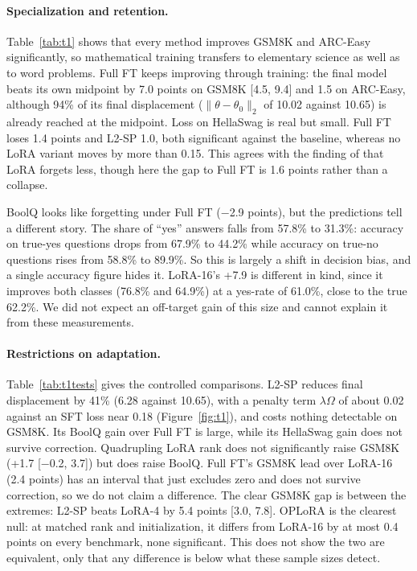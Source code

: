 \documentclass{article}
\begin{document}
\paragraph{Specialization and retention.} Table~\ref{tab:t1} shows that every method improves GSM8K and ARC-Easy significantly, so mathematical training transfers to elementary science as well as to word problems. Full FT keeps improving through training: the final model beats its own midpoint by 7.0 points on GSM8K [4.5, 9.4] and 1.5 on ARC-Easy, although 94\% of its final displacement ($\|\theta-\theta_0\|_2$ of 10.02 against 10.65) is already reached at the midpoint. Loss on HellaSwag is real but small. Full FT loses 1.4 points and L2-SP 1.0, both significant against the baseline, whereas no LoRA variant moves by more than 0.15. This agrees with the finding of \citet{biderman2024lora} that LoRA forgets less, though here the gap to Full FT is 1.6 points rather than a collapse.

BoolQ looks like forgetting under Full FT ($-$2.9 points), but the predictions tell a different story. The share of ``yes'' answers falls from 57.8\% to 31.3\%: accuracy on true-yes questions drops from 67.9\% to 44.2\% while accuracy on true-no questions rises from 58.8\% to 89.9\%. So this is largely a shift in decision bias, and a single accuracy figure hides it. LoRA-16's +7.9 is different in kind, since it improves both classes (76.8\% and 64.9\%) at a yes-rate of 61.0\%, close to the true 62.2\%. We did not expect an off-target gain of this size and cannot explain it from these measurements.

\paragraph{Restrictions on adaptation.} Table~\ref{tab:t1tests} gives the controlled comparisons. L2-SP reduces final displacement by 41\% (6.28 against 10.65), with a penalty term $\lambda\Omega$ of about 0.02 against an SFT loss near 0.18 (Figure~\ref{fig:t1}), and costs nothing detectable on GSM8K. Its BoolQ gain over Full FT is large, while its HellaSwag gain does not survive correction. Quadrupling LoRA rank does not significantly raise GSM8K (+1.7 [$-$0.2, 3.7]) but does raise BoolQ. Full FT's GSM8K lead over LoRA-16 (2.4 points) has an interval that just excludes zero and does not survive correction, so we do not claim a difference. The clear GSM8K gap is between the extremes: L2-SP beats LoRA-4 by 5.4 points [3.0, 7.8]. OPLoRA is the clearest null: at matched rank and initialization, it differs from LoRA-16 by at most 0.4 points on every benchmark, none significant. This does not show the two are equivalent, only that any difference is below what these sample sizes detect.
\end{document}
